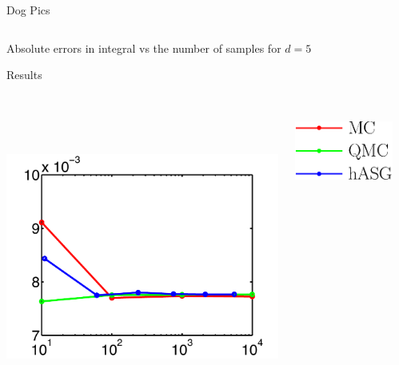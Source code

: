 \documentclass[final]{beamer}
\begin{document}
\begin{frame}{}
{\begin{columns}[t]
\begin{column}{.30\linewidth}
\begin{block}{\centering Dog Pics}
\begin{columns}[T]
\begin{column}{14cm}{}
\end{column}
\end{columns}
\vspace{0.5em}
\centering\scriptsize{Absolute errors in integral vs the number of samples for $d=5$}

\end{block}

                
\begin{block}{\centering Results}
\vspace{-0.5em}
\begin{columns}[T]
\begin{column}{12cm}{}
\includegraphics[height=10cm, width = 14cm]{figures/exp5errors}\\
\end{column}
\begin{column}{4cm}{}
\vspace{2cm}
\centering\includegraphics[height=3cm,width=5cm]{figures/legend2}\\
\vspace{1em}
\end{column}
\begin{column}{14cm}{}

\end{column}
\end{columns}
\end{block}
\end{column}
\end{columns}}
\end{frame}
\end{document}
